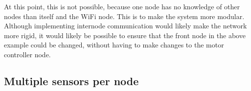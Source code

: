 At this point, this is not possible, because one node has no knowledge of other nodes than itself and the WiFi node. 
This is to make the system more modular.
Although implementing internode communication would likely make the network more rigid, it would likely be possible to ensure that the front node in the above example could be changed, without having to make changes to the motor controller node.

\subsection{Multiple sensors per node}
